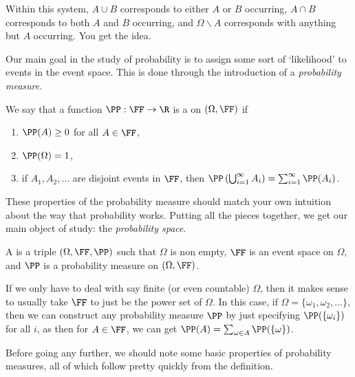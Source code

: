Within this system, $A \cup B$ corresponds to either $A$ or $B$ occurring, $A \cap B$ corresponds to both $A$ and $B$ occurring, and $\Omega \backslash A$ corresponds with anything but $A$ occurring. You get the idea.

Our main goal in the study of probability is to assign some sort of `likelihood' to events in the event space. This is done through the introduction of a \emph{probability measure}.


\begin{definition}
	We say that a function $\PP : \FF \rightarrow \R$ is a  on $(\Omega, \FF)$ if
	\begin{enumerate}
		\item $\PP(A) \geq 0$ for all $A \in \FF$,
		\item $\PP(\Omega) = 1$,
		\item if $A_1, A_2, \dots$ are disjoint events in $\FF$, then $\PP\left(\bigcup_{i = 1}^{\infty} A_i\right) = \sum_{i = 1}^{\infty} \PP(A_i)$.
	\end{enumerate} 
\end{definition}

These properties of the probability measure should match your own intuition about the way that probability works. Putting all the pieces together, we get our main object of study: the \emph{probability space}.

\begin{definition}
	A  is a triple $(\Omega, \FF, \PP)$ such that $\Omega$ is non empty, $\FF$ is an event space on $\Omega$, and $\PP$ is a probability measure on $(\Omega, \FF)$.
\end{definition}


If we only have to deal with say finite (or even countable) $\Omega$, then it makes sense to usually take $\FF$ to just be the power set of $\Omega$. In this case, if $\Omega = \{\omega_1, \omega_2, \dots \}$, then we can construct any probability measure $\PP$ by just specifying $\PP(\{\omega_i\})$ for all $i$, as then for $A \in \FF$, we can get $\PP(A) = \sum_{\omega \in A} \PP(\{\omega\})$.

Before going any further, we should note some basic properties of probability measures, all of which follow pretty quickly from the definition.

